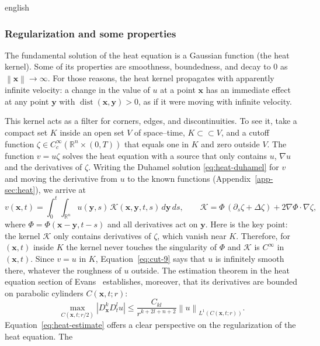 \documentclass[11pt,letterpaper,twoside,openright]{book} %
\newcommand{\norm}[1]{\left\lVert #1 \right\rVert}
\newcommand{\abs}[1]{\left\lvert #1 \right\rvert}
\begin{document}
\begin{hyphenrules}{english}
\subsubsection{Regularization and some properties}
The fundamental solution of the heat equation is a Gaussian function (the heat kernel). Some of its
properties are smoothness, boundedness, and decay to $0$ as $\norm{\mathbf{x}}\to\infty$. For those reasons,
the heat kernel propagates with apparently infinite velocity: a change in the value of $u$ at a point
$\mathbf{x}$ has an immediate effect at any point $\mathbf{y}$ with $\operatorname{dist}(\mathbf{x},\mathbf{y})>0$, as if it were
moving with infinite velocity.

This kernel acts as a filter for corners, edges, and discontinuities. To see it, take a compact set $K$
inside an open set $V$ of space--time, $K\subset\subset V$, and a cutoff function
$\zeta\in C_c^\infty(\mathbb{R}^n\times(0,T))$ that equals one in $K$ and zero outside $V$. The function
$v=u\zeta$ solves the heat equation with a source that only contains $u$, $\nabla u$ and the derivatives
of $\zeta$. Writing the Duhamel solution \eqref{eq:heat-duhamel} for $v$ and moving the derivative from $u$
to the known functions (Appendix~\ref{app-sec:heat}), we arrive at
\begin{equation}
  v(\mathbf{x},t)=\int_0^t\!\!\int_{\mathbb{R}^n}u(\mathbf{y},s)\,\mathcal{K}(\mathbf{x},\mathbf{y},t,s)\,d\mathbf{y}\,d s,
  \qquad\mathcal{K}=\Phi\,(\partial_s\zeta+\Delta\zeta)+2\nabla\Phi\cdot\nabla\zeta,
  \label{eq:cut-9}
\end{equation}
where $\Phi=\Phi(\mathbf{x}-\mathbf{y},t-s)$ and all derivatives act on $\mathbf{y}$. Here is the key point: the kernel $\mathcal{K}$ only contains derivatives of $\zeta$, which vanish
near $K$. Therefore, for $(\mathbf{x},t)$ inside $K$ the kernel never touches the singularity of $\Phi$ and
$\mathcal{K}$ is $C^\infty$ in $(\mathbf{x},t)$. Since $v=u$ in $K$, Equation~\eqref{eq:cut-9} says that $u$ is
infinitely smooth there, whatever the roughness of $u$ outside. The estimation theorem in the heat
equation section of Evans~\cite{evans2010} establishes, moreover, that its derivatives are bounded on
parabolic cylinders $C(\mathbf{x},t;r)$:
\begin{equation}
  \max_{C(\mathbf{x},t;r/2)}\abs{D_{\mathbf{x}}^{k}D_t^{l}u}\le\frac{C_{kl}}{r^{k+2l+n+2}}\norm{u}_{L^1(C(\mathbf{x},t;r))}.
  \label{eq:heat-estimate}
\end{equation}
Equation~\eqref{eq:heat-estimate} offers a clear perspective on the regularization of the heat equation. The

\end{hyphenrules}
\end{document}
